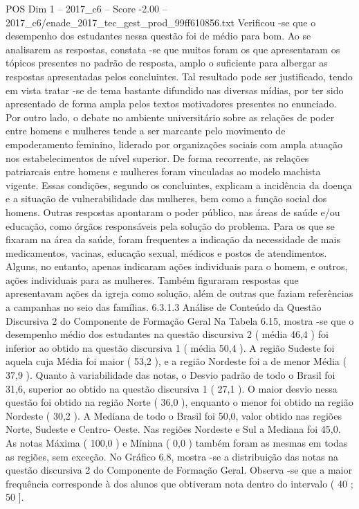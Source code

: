\begin{textsample}{POS Dim 1 – 2017\_c6 – Score -2.00 – 2017\_c6/enade\_2017\_tec\_gest\_prod\_99ff610856.txt}
Verificou -se que o desempenho dos estudantes nessa questão foi de médio para bom.
Ao se analisarem as respostas, constata -se que muitos foram os que apresentaram os tópicos presentes no padrão de resposta, amplo o suficiente para albergar as respostas apresentadas pelos concluintes.
Tal resultado pode ser justificado, tendo em vista tratar -se de tema bastante difundido nas diversas mídias, por ter sido apresentado de forma ampla pelos textos motivadores presentes no enunciado.
Por outro lado, o debate no ambiente universitário sobre as relações de poder entre homens e mulheres tende a ser marcante pelo movimento de empoderamento feminino, liderado por organizações sociais com ampla atuação nos estabelecimentos de nível superior.
De forma recorrente, as relações patriarcais entre homens e mulheres foram vinculadas ao modelo machista vigente.
Essas condições, segundo os concluintes, explicam a incidência da doença e a situação de vulnerabilidade das mulheres, bem como a função social dos homens.
Outras respostas apontaram o poder público, nas áreas de saúde e/ou educação, como órgãos responsáveis pela solução do problema.
Para os que se fixaram na área da saúde, foram frequentes a indicação da necessidade de mais medicamentos, vacinas, educação sexual, médicos e postos de atendimentos.
Alguns, no entanto, apenas indicaram ações individuais para o homem, e outros, ações individuais para as mulheres.
Também figuraram respostas que apresentavam ações da igreja como solução, além de outras que faziam referências a campanhas no seio das famílias. 6.3.1.3 Análise de Conteúdo da Questão Discursiva 2 do Componente de Formação Geral Na Tabela 6.15, mostra -se que o desempenho médio dos estudantes na questão discursiva 2 ( média 46,4 ) foi inferior ao obtido na questão discursiva 1 ( média 50,4 ).
A região Sudeste foi aquela cuja Média foi maior ( 53,2 ), e a região Nordeste foi a de menor Média ( 37,9 ).
Quanto à variabilidade das notas, o Desvio padrão de todo o Brasil foi 31,6, superior ao obtido na questão discursiva 1 ( 27,1 ).
O maior desvio nessa questão foi obtido na região Norte ( 36,0 ), enquanto o menor foi obtido na região Nordeste ( 30,2 ).
A Mediana de todo o Brasil foi 50,0, valor obtido nas regiões Norte, Sudeste e Centro- Oeste.
Nas regiões Nordeste e Sul a Mediana foi 45,0.
As notas Máxima ( 100,0 ) e Mínima ( 0,0 ) também foram as mesmas em todas as regiões, sem exceção.
No Gráfico 6.8, mostra -se a distribuição das notas na questão discursiva 2 do Componente de Formação Geral.
Observa -se que a maior frequência corresponde à dos alunos que obtiveram nota dentro do intervalo ( 40 ; 50 ].

\end{textsample}
